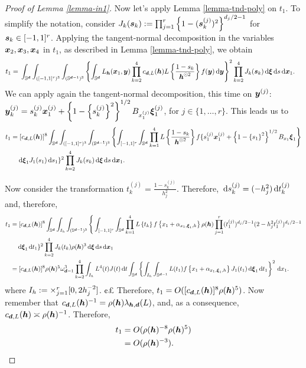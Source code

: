 \documentclass[oneside,11pt]{article}
\begin{document}
\begin{proof}[Proof of Lemma \ref{lemma-in1}]
Now let's apply Lemma \ref{lemma-tnd-poly} on $t_1$. To simplify the notation, consider $J_k(\boldsymbol{s}_k) := \prod_{j=1}^r \left\{1 - (\boldsymbol{s}_k^{(j)})^2\right\}^{d_j/2 -1}$ for $\boldsymbol{s}_k\in[-1,1]^r$. Applying the tangent-normal decomposition in the variables $\boldsymbol{x}_2,\boldsymbol{x}_3,\boldsymbol{x}_4$ in $t_1$, as described in Lemma \ref{lemma-tnd-poly}, we obtain
\begin{align*}
    t_1 =&\; \int_{\mathbb{S}^{\boldsymbol{d}}} \int_{([-1,1]^r)^3} \int_{(\mathbb{S}^{\boldsymbol{d}-1})^3} \left\{ \int_{\mathbb{S}^{\boldsymbol{d}}}L_{{\boldsymbol{h}}} (\boldsymbol{x}_1,\boldsymbol{y}) \prod_{k=2}^{4} c_{\boldsymbol{d},L}({\boldsymbol{h}}) L \left\{ \frac{1 - s_k}{{\boldsymbol{h}}^{\odot 2 }} \right\} f(\boldsymbol{y}) \,\mathrm{d} \boldsymbol{y} \right\}^2 \prod_{k=2}^{4} J_k(\boldsymbol{s}_k) \,\mathrm{d} \boldsymbol\xi \,\mathrm{d} s \,\mathrm{d} \boldsymbol{x}_1.
\end{align*}
We can apply again the tangent-normal decomposition, this time on $\boldsymbol{y}^{(j)}$: $\boldsymbol{y}_k^{(j)} = s_k^{(j)} \boldsymbol{x}_1^{(j)} + \left\{1 - \left\{s_k^{(j)}\right\}^2\right\}^{1/2} B_{x_1^{(j)}} \boldsymbol\xi_1^{(j)}$, for $j \in \{ 1, \dots, r \}$. This leads us to
\begin{align*}
    t_1 =&\; [c_{\boldsymbol{d},L}({\boldsymbol{h}})]^8 \int_{\mathbb{S}^{\boldsymbol{d}}} \int_{([-1,1]^r)^3} \int_{(\mathbb{S}^{\boldsymbol{d}-1})^3} \left\{ \int_{[-1,1]^r} \int_{\mathbb{S}^{\boldsymbol{d}}} \prod_{k=1}^{4} L \left\{ \frac{1 - s_k}{{\boldsymbol{h}}^{\odot 2 }} \right\} f \{ s_1^{(j)} \boldsymbol{x}_1^{(j)} + \left\{1 - \left\{s_1\right\}^2\right\}^{1/2} B_{x_1} \boldsymbol\xi_1 \right\} \\
    & \,\mathrm{d} \boldsymbol\xi_1 J_1(s_1) \,\mathrm{d} s_1 \}^2 \prod_{k=2}^{4} J_k(s_k) \,\mathrm{d} \boldsymbol\xi \,\mathrm{d} s \,\mathrm{d} \boldsymbol{x}_1.
\end{align*}

Now consider the transformation $t_k^{(j)} = \frac{1 - s_k^{(j)}}{h_j^2}$. Therefore, $\,\mathrm{d} s_k^{(j)} = (-h_j^2) \,\mathrm{d} t_k^{(j)}$ and, therefore,
\begin{align*}
    t_1 =&\; [c_{\boldsymbol{d},L}({\boldsymbol{h}})]^8 \int_{\mathbb{S}^{\boldsymbol{d}}} \int_{I_h} \int_{(\mathbb{S}^{\boldsymbol{d}-1})^3} \Bigg\{ \int_{[-1,1]^r} \int_{\mathbb{S}^{\boldsymbol{d}}} \prod_{k=1}^{4} L \left\{ t_k\right\} f \left\{ x_1 + \alpha_{x_1,\boldsymbol\xi_1,h} \right\} \rho ({\boldsymbol{h}}) \prod_{j=1}^r (t_1^{(j)})^{d_j/2 -1} (2 -h_j^2 t_1^{(j)})^{d_j/2 -1} \\
    & \,\mathrm{d} \boldsymbol\xi_1 \,\mathrm{d} t_1 \}^2 \prod_{k=2}^{4} J_k(t_k) \rho ({\boldsymbol{h}})^3 \,\mathrm{d} \boldsymbol\xi \,\mathrm{d} s \,\mathrm{d} \boldsymbol{x}_1 \\
    =&\; [c_{\boldsymbol{d},L}({\boldsymbol{h}})]^8 \rho ({\boldsymbol{h}})^5 \omega_{\boldsymbol{d} - 1}^3 \prod_{k=2}^4 \int_{I_h} L^4(t) J(t) \,\mathrm{d} t \int_{\mathbb{S}^{\boldsymbol{d}}} \left\{ \int_{I_h} \int_{\mathbb{S}^{\boldsymbol{d}-1}} L(t_1)  f \left\{ x_1 + \alpha_{x_1,\boldsymbol\xi_1,h} \right\} J_1(t_1) \,\mathrm{d} \boldsymbol\xi_1 \,\mathrm{d} t_1 \right\}^2 \,\mathrm{d} x_1.
\end{align*}
where $I_h := \times_{j=1}^r [0, 2h_j^{-2}]$.
¢£
Therefore, $t_1 = O([c_{\boldsymbol{d},L}({\boldsymbol{h}})]^8 \rho ({\boldsymbol{h}})^5)$. Now remember that $c_{\boldsymbol{d},L}({\boldsymbol{h}})^{-1} = \rho({\boldsymbol{h}}) \lambda_{{\boldsymbol{h}},\boldsymbol{d}}(L)$, and, as a consequence, $c_{\boldsymbol{d},L}({\boldsymbol{h}}) \asymp \rho({\boldsymbol{h}})^{-1}$. Therefore,
\begin{align*}
    t_1 &= O(\rho ({\boldsymbol{h}})^{-8} \rho ({\boldsymbol{h}})^5) \\
    &= O(\rho ({\boldsymbol{h}})^{-3}).
\end{align*}


\end{proof}
\end{document}
